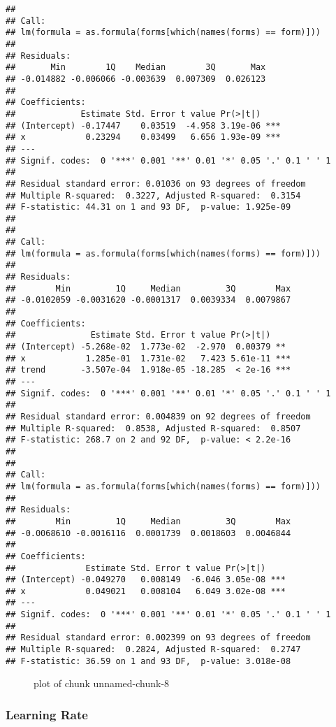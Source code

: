 \begin{verbatim}
## 
## Call:
## lm(formula = as.formula(forms[which(names(forms) == form)]))
## 
## Residuals:
##       Min        1Q    Median        3Q       Max 
## -0.014882 -0.006066 -0.003639  0.007309  0.026123 
## 
## Coefficients:
##             Estimate Std. Error t value Pr(>|t|)    
## (Intercept) -0.17447    0.03519  -4.958 3.19e-06 ***
## x            0.23294    0.03499   6.656 1.93e-09 ***
## ---
## Signif. codes:  0 '***' 0.001 '**' 0.01 '*' 0.05 '.' 0.1 ' ' 1
## 
## Residual standard error: 0.01036 on 93 degrees of freedom
## Multiple R-squared:  0.3227, Adjusted R-squared:  0.3154 
## F-statistic: 44.31 on 1 and 93 DF,  p-value: 1.925e-09
## 
## 
## Call:
## lm(formula = as.formula(forms[which(names(forms) == form)]))
## 
## Residuals:
##        Min         1Q     Median         3Q        Max 
## -0.0102059 -0.0031620 -0.0001317  0.0039334  0.0079867 
## 
## Coefficients:
##               Estimate Std. Error t value Pr(>|t|)    
## (Intercept) -5.268e-02  1.773e-02  -2.970  0.00379 ** 
## x            1.285e-01  1.731e-02   7.423 5.61e-11 ***
## trend       -3.507e-04  1.918e-05 -18.285  < 2e-16 ***
## ---
## Signif. codes:  0 '***' 0.001 '**' 0.01 '*' 0.05 '.' 0.1 ' ' 1
## 
## Residual standard error: 0.004839 on 92 degrees of freedom
## Multiple R-squared:  0.8538, Adjusted R-squared:  0.8507 
## F-statistic: 268.7 on 2 and 92 DF,  p-value: < 2.2e-16
## 
## 
## Call:
## lm(formula = as.formula(forms[which(names(forms) == form)]))
## 
## Residuals:
##        Min         1Q     Median         3Q        Max 
## -0.0068610 -0.0016116  0.0001739  0.0018603  0.0046844 
## 
## Coefficients:
##              Estimate Std. Error t value Pr(>|t|)    
## (Intercept) -0.049270   0.008149  -6.046 3.05e-08 ***
## x            0.049021   0.008104   6.049 3.02e-08 ***
## ---
## Signif. codes:  0 '***' 0.001 '**' 0.01 '*' 0.05 '.' 0.1 ' ' 1
## 
## Residual standard error: 0.002399 on 93 degrees of freedom
## Multiple R-squared:  0.2824, Adjusted R-squared:  0.2747 
## F-statistic: 36.59 on 1 and 93 DF,  p-value: 3.018e-08
\end{verbatim}

\begin{figure}
\centering
{}
\caption{plot of chunk unnamed-chunk-8}
\end{figure}

\subsubsection{Learning Rate}\label{learning-rate}

